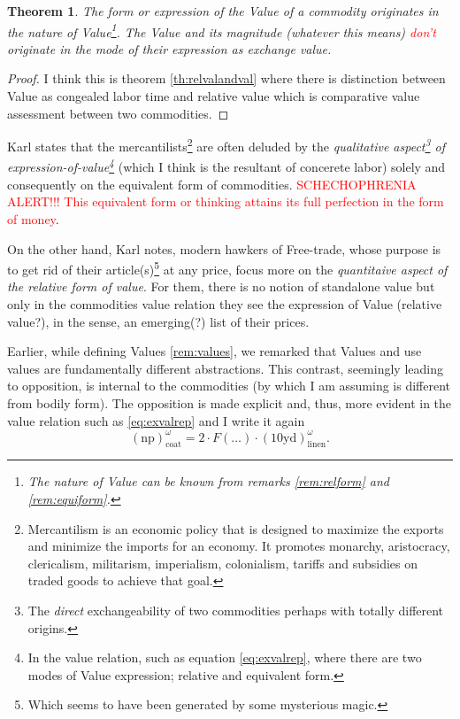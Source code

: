 \documentclass[12pt]{extarticle}
\newtheorem{theorem}{Theorem}[section]
\theoremstyle{definition}
\begin{document}
  \begin{theorem}
    The form or expression of the Value of a commodity originates in the nature of Value\footnote{The nature of Value can be known from remarks \ref{rem:relform} and \ref{rem:equiform}.}.  The Value and its magnitude (whatever this means) \textcolor{red}{don't} originate in the mode of their expression as exchange value.
  \end{theorem}

  \begin{proof}
    I think this is theorem \ref{th:relvalandval} where there is distinction between Value as congealed labor time and relative value which is comparative value assessment between two commodities.
  \end{proof}

  Karl states that the mercantilists\footnote{Mercantilism is an economic policy that is designed to maximize the exports and minimize the imports for an economy. It promotes monarchy, aristocracy, clericalism, militarism, imperialism, colonialism, tariffs and subsidies on traded goods to achieve that goal.} are often deluded by the \emph{qualitative aspect\footnote{The \emph{direct} exchangeability of two commodities perhaps with totally different origins.} of expression-of-value\footnote{In the value relation, such as equation \ref{eq:exvalrep}, where there are two modes of Value expression; relative and equivalent form.}} (which I think is the resultant of concerete labor) solely and consequently on the equivalent form of commodities.  \textcolor{red}{SCHECHOPHRENIA ALERT!!! This equivalent form or thinking attains its full perfection in the form of money}.

  On the other hand, Karl notes, modern hawkers of Free-trade, whose purpose is to get rid of their article(s)\footnote{Which seems to have been generated by some mysterious magic.} at any price, focus more on the \emph{quantitaive aspect of the relative form of value}.  For them, there is no notion of standalone value but only in the commodities value relation they see the expression of Value (relative value?), in the sense, an emerging(?) list of their prices.

  Earlier, while defining Values \ref{rem:values}, we remarked that Values and use values are fundamentally different abstractions.  This contrast, seemingly leading to opposition, is internal to the commodities (by which I am assuming is different from bodily form).  The opposition is made explicit and, thus, more evident in the value relation such as \ref{eq:exvalrep} and I write it again
  \begin{equation}
   (\text{np})_{\text{coat}}^{\omega} = 2\cdot F(\ldots)\cdot (10\text{yd})_{\text{linen}}^{\omega}.
 \end{equation}
\end{document}
